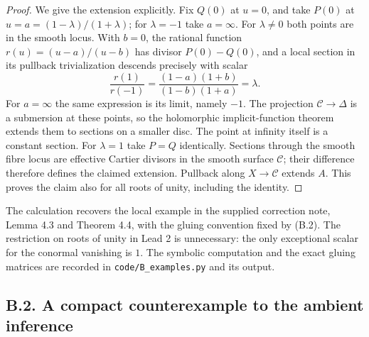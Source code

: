 \begin{proof}
We give the extension explicitly. Fix $Q(0)$ at $u=0$, and take $P(0)$ at $u=a=(1-\lambda)/(1+\lambda)$; for $\lambda=-1$ take $a=\infty$. For $\lambda\ne0$ both points are in the smooth locus. With $b=0$, the rational function $r(u)=(u-a)/(u-b)$ has divisor $P(0)-Q(0)$, and a local section in its pullback trivialization descends precisely with scalar
\[
 \frac{r(1)}{r(-1)}
 =\frac{(1-a)(1+b)}{(1-b)(1+a)}=\lambda.
\]
For $a=\infty$ the same expression is its limit, namely $-1$. The projection $\mathcal C\to\Delta$ is a submersion at these points, so the holomorphic implicit-function theorem extends them to sections on a smaller disc. The point at infinity itself is a constant section. For $\lambda=1$ take $P=Q$ identically. Sections through the smooth fibre locus are effective Cartier divisors in the smooth surface $\mathcal C$; their difference therefore defines the claimed extension. Pullback along $X\to\mathcal C$ extends $A$. This proves the claim also for all roots of unity, including the identity.
\end{proof}

The calculation recovers the local example in the supplied correction note, Lemma 4.3 and Theorem 4.4, with the gluing convention fixed by (B.2). The restriction on roots of unity in Lead 2 is unnecessary: the only exceptional scalar for the conormal vanishing is $1$. The symbolic computation and the exact gluing matrices are recorded in \texttt{code/B\_examples.py} and its output.


\subsection{B.2. A compact counterexample to the ambient inference}



